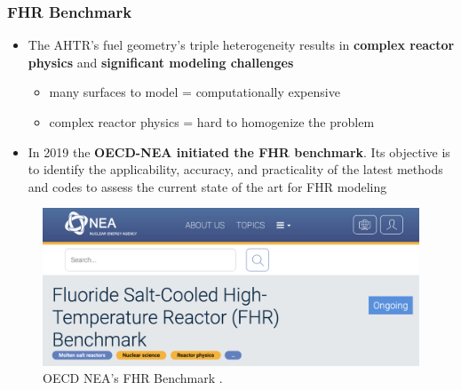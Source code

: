     \begin{frame}
    \frametitle{FHR Benchmark}
    \begin{itemize}
        \item The AHTR's fuel geometry's triple heterogeneity results in
        \textbf{complex reactor physics} and \textbf{significant modeling challenges}
        \begin{itemize}
            \item many surfaces to model = computationally expensive 
            \item complex reactor physics = hard to homogenize the problem
        \end{itemize}
        \item In 2019 the \textbf{OECD-NEA initiated the FHR benchmark}. Its objective 
        is to identify the applicability, accuracy, and practicality of the latest 
        methods and codes to assess the current state of the art for FHR modeling
    \end{itemize}
    \begin{figure}[]
        \includegraphics[width=0.7\linewidth]{figures/benchmark.png} 
        \caption{OECD NEA's FHR Benchmark \cite{petrovic_benchmark_2021}.}
    \end{figure}
    \end{frame}

